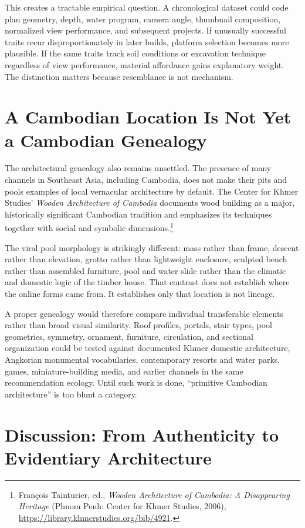 \documentclass[11pt]{article}
\begin{document}
This creates a tractable empirical question. A chronological dataset could code plan geometry, depth, water program, camera angle, thumbnail composition, normalized view performance, and subsequent projects. If unusually successful traits recur disproportionately in later builds, platform selection becomes more plausible. If the same traits track soil conditions or excavation technique regardless of view performance, material affordance gains explanatory weight. The distinction matters because resemblance is not mechanism.

\section{A Cambodian Location Is Not Yet a Cambodian Genealogy}

The architectural genealogy also remains unsettled. The presence of many channels in Southeast Asia, including Cambodia, does not make their pits and pools examples of local vernacular architecture by default. The Center for Khmer Studies' \emph{Wooden Architecture of Cambodia} documents wood building as a major, historically significant Cambodian tradition and emphasizes its techniques together with social and symbolic dimensions.\footnote{François Tainturier, ed., \emph{Wooden Architecture of Cambodia: A Disappearing Heritage} (Phnom Penh: Center for Khmer Studies, 2006), \url{https://library.khmerstudies.org/bib/4921}.}

The viral pool morphology is strikingly different: mass rather than frame, descent rather than elevation, grotto rather than lightweight enclosure, sculpted bench rather than assembled furniture, pool and water slide rather than the climatic and domestic logic of the timber house. That contrast does not establish where the online forms came from. It establishes only that location is not lineage.

A proper genealogy would therefore compare individual transferable elements rather than broad visual similarity. Roof profiles, portals, stair types, pool geometries, symmetry, ornament, furniture, circulation, and sectional organization could be tested against documented Khmer domestic architecture, Angkorian monumental vocabularies, contemporary resorts and water parks, games, miniature-building media, and earlier channels in the same recommendation ecology. Until such work is done, ``primitive Cambodian architecture'' is too blunt a category.

\section{Discussion: From Authenticity to Evidentiary Architecture}
\end{document}
